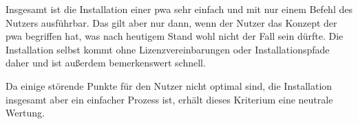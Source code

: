 Insgesamt ist die Installation einer \ac{pwa} sehr einfach und mit nur einem Befehl des Nutzers ausführbar. Das gilt aber nur dann, wenn der Nutzer das Konzept der \ac{pwa} begriffen hat, was nach heutigem Stand wohl nicht der Fall sein dürfte. Die Installation selbst kommt ohne Lizenzvereinbarungen oder Installationspfade daher und ist außerdem bemerkenswert schnell.

Da einige störende Punkte für den Nutzer nicht optimal sind, die Installation insgesamt aber ein einfacher Prozess ist, erhält dieses Kriterium eine neutrale Wertung.